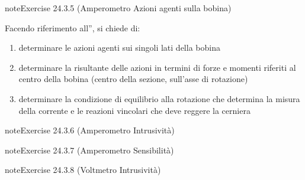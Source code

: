 \documentclass[letterpaper,10pt,italian]{jupyterBook}
\begin{document}
\begin{sphinxadmonition}{note}{Exercise 24.3.5 (Amperometro \sphinxhyphen{} Azioni agenti sulla bobina)}



\sphinxAtStartPar
Facendo riferimento all”{\hyperref[\detokenize{ch/electromagnetism/electromagnetism-steady:physics-hs-electromagnetism-electromagnetism-steady-experience-faraday-amperometer}]{}}, si chiede di:
\begin{enumerate}
%
\item {} 
\sphinxAtStartPar
determinare le azioni agenti sui singoli lati della bobina

\item {} 
\sphinxAtStartPar
determinare la risultante delle azioni in termini di forze e momenti riferiti al centro della bobina (centro della sezione, sull’asse di rotazione)

\item {} 
\sphinxAtStartPar
determinare la condizione di equilibrio alla rotazione che determina la misura della corrente e le reazioni vincolari che deve reggere la cerniera

\end{enumerate}
\end{sphinxadmonition}
 \label{exercise:ch/electromagnetism/electromagnetism-steady-problems-exercise-1}

\begin{sphinxadmonition}{note}{Exercise 24.3.6 (Amperometro \sphinxhyphen{} Intrusività)}


\end{sphinxadmonition}
 \label{exercise:ch/electromagnetism/electromagnetism-steady-problems-exercise-2}

\begin{sphinxadmonition}{note}{Exercise 24.3.7 (Amperometro \sphinxhyphen{} Sensibilità)}


\end{sphinxadmonition}
 \label{exercise:ch/electromagnetism/electromagnetism-steady-problems-exercise-3}

\begin{sphinxadmonition}{note}{Exercise 24.3.8 (Voltmetro \sphinxhyphen{} Intrusività)}


\end{sphinxadmonition}
\end{document}
